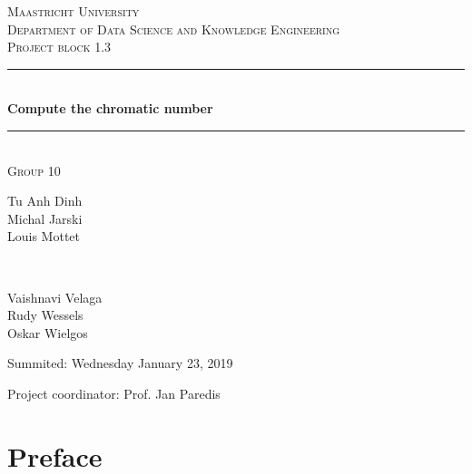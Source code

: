 \documentclass[a4paper]{report}
\begin{document}
	\begin{titlepage} 
		\newcommand{\HRule}{\rule{\linewidth}{0.5mm}} 
		
		\center
		
		\textsc{\LARGE Maastricht University}\\[1.5cm]
		
		\textsc{\Large Department of Data Science and Knowledge Engineering}\\[0.5cm] 
		
		\textsc{\large Project block 1.3}\\[0.5cm] 
		
		\HRule\\[0.4cm]
		
		{\huge\bfseries Compute the chromatic number}\\[0.4cm] 
		
		\HRule\\[1.5cm]
		
		\textsc{\large Group 10}\\[0.5cm]
		
		\begin{minipage}{0.6\textwidth}
			\begin{flushleft}
				Tu Anh Dinh\\Michal Jarski\\Louis Mottet
			\end{flushleft}
		\end{minipage}
		~
		\begin{minipage}{0.3\textwidth}
			\begin{flushleft}
				Vaishnavi Velaga\\Rudy Wessels\\Oskar Wielgos
			\end{flushleft}
		\end{minipage}
	
		 \vspace{1cm}
		Summited: Wednesday January 23, 2019
		\vspace{3cm}
		\begin{flushleft}
			Project coordinator: Prof. Jan Paredis
		\end{flushleft}
		
	\end{titlepage}
	
	\chapter*{Preface}
\end{document}

